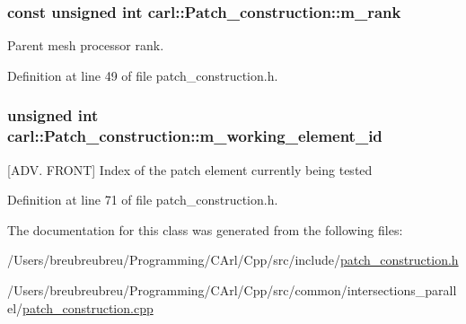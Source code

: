 \subsubsection[{m\+\_\+rank}]{\setlength{\rightskip}{0pt plus 5cm}const unsigned int carl\+::\+Patch\+\_\+construction\+::m\+\_\+rank\hspace{0.3cm}{\ttfamily [protected]}}\label{classcarl_1_1_patch__construction_abb348e12e9fb16cb426e68127ec02c95}


Parent mesh processor rank. 



Definition at line 49 of file patch\+\_\+construction.\+h.

\hypertarget{classcarl_1_1_patch__construction_a7889a62e6717124c405bc508b03f3254}{}
\subsubsection[{m\+\_\+working\+\_\+element\+\_\+id}]{\setlength{\rightskip}{0pt plus 5cm}unsigned int carl\+::\+Patch\+\_\+construction\+::m\+\_\+working\+\_\+element\+\_\+id\hspace{0.3cm}{\ttfamily [protected]}}\label{classcarl_1_1_patch__construction_a7889a62e6717124c405bc508b03f3254}


\mbox{[}A\+D\+V. F\+R\+O\+N\+T\mbox{]} Index of the patch element currently being tested 



Definition at line 71 of file patch\+\_\+construction.\+h.



The documentation for this class was generated from the following files\+:\begin{DoxyCompactItemize}
\item 
/\+Users/breubreubreu/\+Programming/\+C\+Arl/\+Cpp/src/include/\hyperlink{patch__construction_8h}{patch\+\_\+construction.\+h}\item 
/\+Users/breubreubreu/\+Programming/\+C\+Arl/\+Cpp/src/common/intersections\+\_\+parallel/\hyperlink{patch__construction_8cpp}{patch\+\_\+construction.\+cpp}\end{DoxyCompactItemize}
